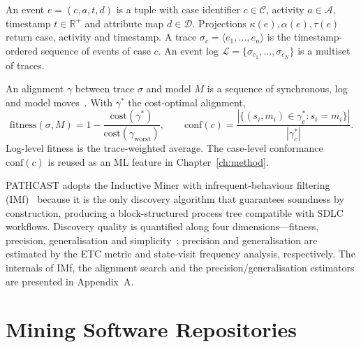 \begin{definition}
\label{def:event}
\label{def:event-log}
An event $e = (c, a, t, d)$ is a tuple with case identifier
$c \in \mathcal{C}$, activity $a \in \mathcal{A}$, timestamp
$t \in \mathbb{R}^+$ and attribute map $d \in \mathcal{D}$. Projections
$\kappa(e), \alpha(e), \tau(e)$ return case, activity and timestamp. A
trace $\sigma_c = \langle e_1, \ldots, e_n \rangle$ is the
timestamp-ordered sequence of events of case $c$. An event log
$\mathcal{L} = \{\sigma_{c_1}, \ldots, \sigma_{c_N}\}$ is a multiset of
traces.
\end{definition}

\begin{definition}
\label{def:alignment}
\label{def:fitness}
An alignment $\gamma$ between trace $\sigma$ and model $M$ is a sequence
of synchronous, log and model moves~\cite{adriansyah2011alignments}. With
$\gamma^*$ the cost-optimal alignment,
\begin{equation}
\label{eq:fitness}
\text{fitness}(\sigma, M) = 1 - \frac{\text{cost}(\gamma^*)}
{\text{cost}(\gamma_{\text{worst}})},
\qquad
\text{conf}(c) = \frac{|\{(s_i,m_i)\in\gamma^*_c : s_i=m_i\}|}{|\gamma^*_c|}.
\label{eq:case-conformance-cap2}
\end{equation}
Log-level fitness is the trace-weighted average. The case-level
conformance $\text{conf}(c)$ is reused as an ML feature in
Chapter~\ref{ch:method}.
\end{definition}

PATHCAST adopts the Inductive Miner with infrequent-behaviour filtering
(IMf)~\cite{leemans2013discovering} because it is the only discovery
algorithm that guarantees soundness by construction, producing a
block-structured process tree compatible with SDLC workflows. Discovery
quality is quantified along four dimensions---fitness, precision,
generalisation and simplicity~\cite{aalst2016process}; precision and
generalisation are estimated by the ETC metric and state-visit frequency
analysis, respectively. The internals of IMf, the alignment search and
the precision/generalisation estimators are presented in Appendix~A.


\section{Mining Software Repositories}
\label{sec:msr}

